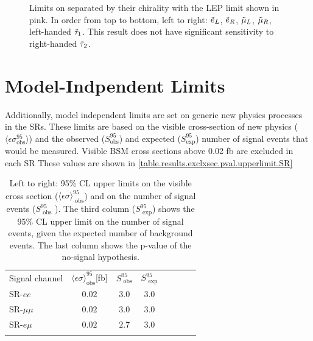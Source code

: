 \begin{figure}[!ht]
    \caption{Limits on \slep separated by their chirality with the \ac{LEP} limit shown in pink. In order from top to bottom, left to right: $\tilde{e}_{L}$, $\tilde{e}_{R}$, $\tilde{\mu}_{L}$, $\tilde{\mu}_{R}$, left-handed $\tilde{\tau}_{1}$. This result does not have significant sensitivity to right-handed $\tilde{\tau}_{2}$.}
    \label{fig:lep_comp}
\end{figure}

\FloatBarrier

\section{Model-Indpendent Limits}
Additionally, model independent limits are set on generic new physics processes in the \acp{SR}. These limits are based on the visible cross-section of new physics ($\langle \epsilon \sigma^{95}_{\text{obs}} \rangle$) and the observed ($S^{95}_{\text{obs}}$) and expected ($S^{95}_{\text{exp}}$) number of signal events that would be measured. Visible \ac{BSM} cross sections above 0.02 fb are excluded in each \ac{SR} These values are shown in \autoref{table.results.exclxsec.pval.upperlimit.SR}

\begin{table}[hbt]
\centering
\begin{tabular*}{\textwidth}{@{\extracolsep{\fill}}lccccccc}
\noalign{\smallskip}\noalign{\smallskip}
{ Signal channel} & $\langle\epsilon{ \sigma}\rangle_\text{obs}^{95}$[fb]  &  $S_\text{ obs}^{95}$  & $S_\text{ exp}^{95}$  
\\
\noalign{\smallskip}\hline\noalign{\smallskip}
 SR-$ee$   & $0.02$ &  $3.0$ & $ 3.0$   \\%
 SR-$\mu\mu$   &$0.02$ &  $3.0$ & $ 3.0$  \\%
SR-$e\mu$   &$0.02$ &  $2.7$ & $ 3.0$  \\%
\noalign{\smallskip}\hline\noalign{\smallskip}
\end{tabular*}
\caption[Breakdown of upper limits.]{
Left to right: 95\% CL upper limits on the visible cross section
($\langle\epsilon\sigma\rangle_\text{ obs}^{95}$) and on the number of
signal events ($S_\text{ obs}^{95}$ ).  The third column
($S_\text{ exp}^{95}$) shows the 95\% CL upper limit on the number of
signal events, given the expected number of background events. The last column shows the p-value of the no-signal hypothesis.
\label{table.results.exclxsec.pval.upperlimit.SR}}
\end{table}